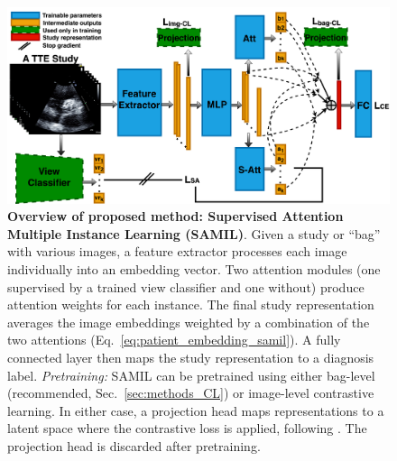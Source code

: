 \begin{figure}[!t]
% 
\includegraphics[width=1\textwidth]{figures/SAMIL_diagram_draft1.png}
\caption{\textbf{Overview of proposed method: Supervised Attention Multiple Instance Learning (SAMIL)}.
Given a study or ``bag'' with various images, a feature extractor processes each image individually into an embedding vector. Two attention modules (one supervised by a trained view classifier and one without) produce attention weights for each instance. The final study representation averages the image embeddings weighted by a combination of the two attentions (Eq.~\eqref{eq:patient_embedding_samil}). A fully connected layer then maps the study representation to a diagnosis label. 
\emph{Pretraining:} SAMIL can be pretrained using either bag-level (recommended, Sec.~\ref{sec:methods_CL}) or image-level contrastive learning. In either case, a projection head maps representations to a latent space where the contrastive loss is applied, following \citep{chen2020simple, chen2020improved}. The projection head is discarded after pretraining.
}%
\label{fig:workflow_diagram}
\end{figure}